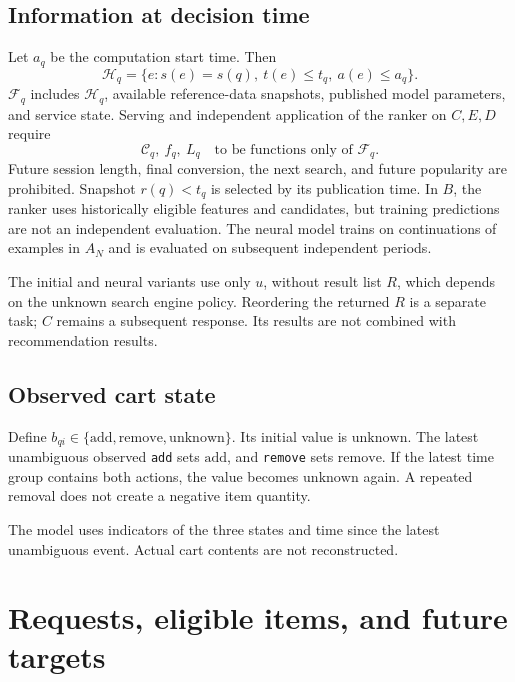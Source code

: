 \documentclass[12pt,a4paper]{article}
\newcommand{\code}[1]{{\ttfamily\small\nolinkurl{#1}}}
\theoremstyle{plainru}
\begin{document}
\subsection{Information at decision time}

Let \(a_q\) be the computation start time. Then
\begin{equation}\label{eq:time-history}
\mathcal H_q=\{e:s(e)=s(q),\ t(e)\le t_q,\ a(e)\le a_q\}.
\end{equation}
\(\mathcal F_q\) includes \(\mathcal H_q\), available reference-data
snapshots, published model parameters, and service state.
Serving and independent application of the ranker on $C,E,D$ require
\begin{equation}\label{eq:time-adapted}
\mathcal C_q,\ f_q,\ L_q\quad\text{to be functions only of }\mathcal F_q.
\end{equation}
Future session length, final conversion, the next search, and future
popularity are prohibited. Snapshot \(r(q)<t_q\) is selected by its
publication time. In $B$, the ranker uses historically eligible features
and candidates, but training predictions are not an independent evaluation.
The neural model trains on continuations of examples in \(A_N\) and is evaluated
on subsequent independent periods.

The initial and neural variants use only \(u\), without result list \(R\),
which depends on the unknown search engine policy.
Reordering the returned \(R\) is a separate task;
\(C\) remains a subsequent response. Its results are not combined
with recommendation results.

\subsection{Observed cart state}

Define \(b_{qi}\in\{\mathrm{add},\mathrm{remove},\mathrm{unknown}\}\).
Its initial value is \(\mathrm{unknown}\). The latest unambiguous
observed \code{add} sets \(\mathrm{add}\), and \code{remove}
sets \(\mathrm{remove}\). If the latest time group contains
both actions, the value becomes \(\mathrm{unknown}\) again.
A repeated removal does not create a negative item quantity.

The model uses indicators of the three states and time since the latest
unambiguous event. Actual cart contents are not reconstructed.

\section{Requests, eligible items, and future targets}\label{sec:requests}
\end{document}
